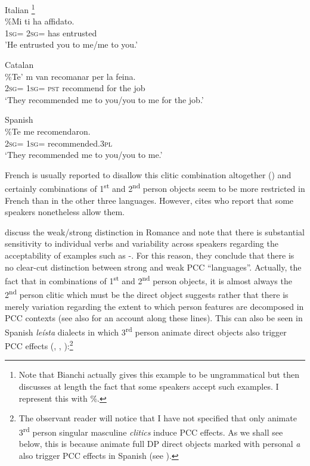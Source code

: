 \documentclass[output=paper,colorlinks,citecolor=brown,nonflat]{langsci/langscibook}
\begin{document}
\ea%
    \label{ex:sheehan:5}
    Italian \citep[2027]{Bianchi2006}\footnote{Note that Bianchi actually gives this example to be ungrammatical but then discusses at length the fact that some speakers accept such examples. I represent this with \%.}\\
    \gll    \%Mi   ti     ha   affidato.\\
            \textsc{1sg}=  \textsc{2sg=}   has   entrusted\\
    \glt    'He entrusted you to me/me to you.’
\z

\ea%
    \label{ex:sheehan:6}
    Catalan \citep[179]{Bonet1991}\\
    \gll    \%Te’  m   van   recomanar   per   la   feina.\\
            \textsc{2sg=}  \textsc{1sg}=   \textsc{pst}   recommend  for   the   job\\
    \glt    ‘They recommended me to you/you to me for the job.’
\z

\ea%
    \label{ex:sheehan:7}
    Spanish \citep[61]{Perlmutter1971}\\
    \gll    \%Te   me   recomendaron.\\
            \textsc{2sg}=  \textsc{1sg}=   recommended.\textsc{3pl}\\
    \glt    ‘They recommended me to you/you to me.’
\z

French is usually reported to disallow this clitic combination altogether (\citealt{Kayne1975, Quicoli1984}) and certainly combinations of 1\textsuperscript{st} and 2\textsuperscript{nd} person objects seem to be more restricted in French than in the other three languages. However,  \citet[180]{Bonet1991} cites \citet{SimpsonWithgott1986} who report that some speakers nonetheless allow them.

\citet{OrmazabalRomero2007} discuss the weak/strong distinction in Romance and note that there is substantial sensitivity to individual verbs and variability across speakers regarding the acceptability of examples such as -. For this reason, they conclude that there is no clear-cut distinction between strong and weak PCC ``languages''. Actually, the fact that in combinations of 1\textsuperscript{st} and 2\textsuperscript{nd} person objects, it is almost always the 2\textsuperscript{nd} person clitic which must be the direct object suggests rather that there is merely variation regarding the extent to which person features are decomposed in PCC contexts (see also \citealt{Anagnostopoulou2005} for an account along these lines). This can also be seen in Spanish \textit{leísta} dialects in which 3\textsuperscript{rd} person animate direct objects also trigger PCC effects (\citealt{OrmazabalRomero2007}, \citeyear{OrmazabalRomero2010}, \citeyear{OrmazabalRomero2013Borealis}):\footnote{The observant reader will notice that I have not specified that only animate 3\textsuperscript{rd} person singular masculine \textit{clitics} induce PCC effects. As we shall see below, this is because animate full DP direct objects marked with personal \textit{a} also trigger PCC effects in Spanish (see \citealt{OrmazabalRomero2013Borealis}).}
\end{document}
